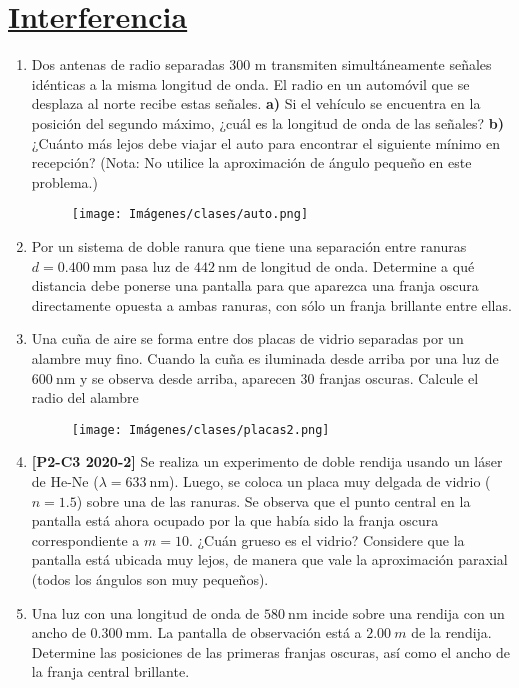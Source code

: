 \documentclass[letterpaper,11pt]{article}
\begin{document}
\section*{\underline{Interferencia}}
\begin{enumerate}\setlength{\itemsep}{0.4cm}


\item Dos antenas de radio separadas 300 m transmiten simultáneamente señales idénticas a la misma longitud de onda. El radio en un automóvil que se desplaza al norte recibe estas señales. \textbf{a)} Si el vehículo se encuentra en la posición del segundo máximo, ¿cuál es la longitud de onda de las señales? \textbf{b)} ¿Cuánto más lejos debe viajar el auto para encontrar el siguiente mínimo en recepción? (Nota: No utilice la aproximación de ángulo pequeño en este problema.)

\begin{figure}[H]
    \centering
    \texttt{[image: Imágenes/clases/auto.png]}
\end{figure}

\item Por un sistema de doble ranura que tiene una separación entre
ranuras $d = \SI{0.400}{\mm}$ pasa luz de $\SI{442}{\nm}$ de longitud de onda. Determine a qué distancia debe ponerse una pantalla para que
aparezca una franja oscura directamente opuesta a ambas ranuras, con sólo un franja brillante entre ellas.

\item Una cuña de aire se forma entre dos placas de vidrio separadas
por un alambre muy fino. Cuando la cuña es iluminada desde arriba por una luz de $\SI{600}{\nm}$ y se observa desde arriba, aparecen 30 franjas oscuras. Calcule el radio del alambre

\begin{figure}[H]
    \centering
    \texttt{[image: Imágenes/clases/placas2.png]}
\end{figure}

\item \textbf{[P2-C3 2020-2]} Se realiza un experimento de doble rendija usando un láser de He-Ne ($\lambda = \SI{633}{\nm}$). Luego, se coloca un placa muy delgada de vidrio ($n = 1.5$) sobre una de las ranuras. Se observa que el punto central en la pantalla está ahora ocupado por la que había sido la franja oscura correspondiente a $m = 10$. ¿Cuán grueso es el vidrio?
Considere que la pantalla está ubicada muy lejos, de manera que vale la aproximación paraxial (todos los ángulos son muy pequeños).

\item Una luz con una longitud de onda de $\SI{580}{\nm}$ incide sobre una rendija con un ancho de $\SI{0.300}{\mm}$. La pantalla de observación está a $\SI{2.00}{m}$ de la rendija. Determine las posiciones de las primeras franjas oscuras, así como el ancho de la franja central brillante.

\end{enumerate}
\end{document}
